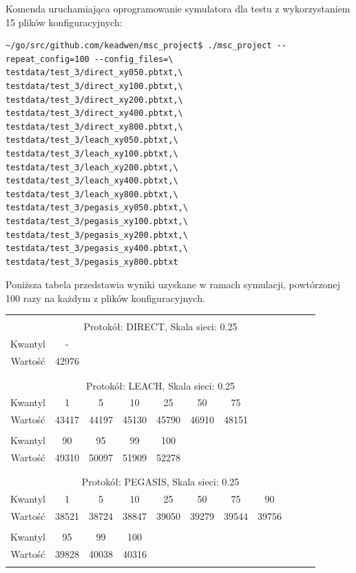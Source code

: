 \documentclass[a4paper,12pt,twoside,openany]{report}
\begin{document}
Komenda uruchamiająca oprogramowanie symulatora dla testu z wykorzystaniem 15 plików konfiguracyjnych:

\begin{lstlisting}
~/go/src/github.com/keadwen/msc_project$ ./msc_project --repeat_config=100 --config_files=\
testdata/test_3/direct_xy050.pbtxt,\
testdata/test_3/direct_xy100.pbtxt,\
testdata/test_3/direct_xy200.pbtxt,\
testdata/test_3/direct_xy400.pbtxt,\
testdata/test_3/direct_xy800.pbtxt,\
testdata/test_3/leach_xy050.pbtxt,\
testdata/test_3/leach_xy100.pbtxt,\
testdata/test_3/leach_xy200.pbtxt,\
testdata/test_3/leach_xy400.pbtxt,\
testdata/test_3/leach_xy800.pbtxt,\
testdata/test_3/pegasis_xy050.pbtxt,\
testdata/test_3/pegasis_xy100.pbtxt,\
testdata/test_3/pegasis_xy200.pbtxt,\
testdata/test_3/pegasis_xy400.pbtxt,\
testdata/test_3/pegasis_xy800.pbtxt
\end{lstlisting}

Poniższa tabela przedstawia wyniki uzyskane w ramach symulacji, powtórzonej 100 razy na każdym z plików konfiguracyjnych. 

\begin{longtable}{*{11}{c}}
\toprule \\*
\multicolumn{11}{c}{Protokół: DIRECT, Skala sieci: 0.25} \\*
Kwantyl	& -	\\*
Wartość	& 42976	\\*
\midrule \\*
\\*
\multicolumn{11}{c}{Protokół: LEACH, Skala sieci: 0.25} \\*
Kwantyl	& 1	& 5	& 10	& 25	& 50	& 75	\\*
Wartość	& 43417	& 44197	& 45130	& 45790	& 46910	& 48151	\\*
& \\*
Kwantyl	& 90	& 95	& 99	& 100	\\*
Wartość	& 49310	& 50097	& 51909	& 52278	\\*
\midrule \\*
\\*
\multicolumn{11}{c}{Protokół: PEGASIS, Skala sieci: 0.25} \\*
Kwantyl	& 1	& 5	& 10	& 25	& 50	& 75	& 90	\\*
Wartość	& 38521	& 38724	& 38847	& 39050	& 39279	& 39544	& 39756	\\*
& \\*
Kwantyl	& 95	& 99	& 100	\\*
Wartość	& 39828	& 40038	& 40316	\\*
\bottomrule \\*
\end{longtable}
\end{document}
